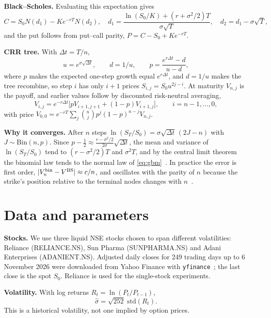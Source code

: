 \documentclass[10pt,a4paper]{article}
\begin{document}
\textbf{Black--Scholes.} Evaluating this expectation gives~\cite{bs73,hull}
\begin{equation}\label{eq:bs}
C=S_0N(d_1)-Ke^{-rT}N(d_2),\quad d_1=\frac{\ln(S_0/K)+(r+\sigma^2/2)T}{\sigma\sqrt T},\quad d_2=d_1-\sigma\sqrt T,
\end{equation}
and the put follows from put--call parity, $P=C-S_0+Ke^{-rT}$.

\textbf{CRR tree.} With $\Delta t=T/n$,
\begin{equation}\label{eq:crr}
u=e^{\sigma\sqrt{\Delta t}},\qquad d=1/u,\qquad p=\frac{e^{r\Delta t}-d}{u-d},
\end{equation}
where $p$ makes the expected one-step growth equal $e^{r\Delta t}$, and $d=1/u$ makes the tree
recombine, so step $i$ has only $i+1$ prices $S_{i,j}=S_0u^{2j-i}$. At maturity $V_{n,j}$ is the payoff,
and earlier values follow by discounted risk-neutral averaging,
\begin{equation}\label{eq:backward}
V_{i,j}=e^{-r\Delta t}\big[pV_{i+1,j+1}+(1-p)V_{i+1,j}\big],\qquad i=n-1,\dots,0,
\end{equation}
with price $V_{0,0}=e^{-rT}\sum_{j}\binom nj p^j(1-p)^{n-j}V_{n,j}$.

\textbf{Why it converges.} After $n$ steps $\ln(S_T/S_0)=\sigma\sqrt{\Delta t}\,(2J-n)$ with
$J\sim\mathrm{Bin}(n,p)$. Since $p-\tfrac12\approx\frac{r-\sigma^2/2}{2\sigma}\sqrt{\Delta t}$, the mean
and variance of $\ln(S_T/S_0)$ tend to $(r-\sigma^2/2)T$ and $\sigma^2T$, and by the central limit theorem
the binomial law tends to the normal law of \eqref{eq:gbm}~\cite{crr79}. In practice the error is first
order, $|V^{\rm bin}_n-V^{\rm BS}|\approx c/n$, and oscillates with the parity of $n$ because the strike's
position relative to the terminal nodes changes with $n$~\cite{leisen96}.

\section{Data and parameters}
\textbf{Stocks.} We use three liquid NSE stocks chosen to span different volatilities: Reliance
(RELIANCE.NS), Sun Pharma (SUNPHARMA.NS) and Adani Enterprises (ADANIENT.NS). Adjusted daily closes for 249 trading days up
to 6 November 2026 were downloaded from Yahoo Finance with \texttt{yfinance}~\cite{yfinance}; the last close
is the spot $S_0$. Reliance is used for the single-stock experiments.

\textbf{Volatility.} With log returns $R_t=\ln(P_t/P_{t-1})$,
\begin{equation}\label{eq:vol}
\hat\sigma=\sqrt{252}\;\mathrm{std}(R_t).
\end{equation}
This is a historical volatility, not one implied by option prices.
\end{document}
